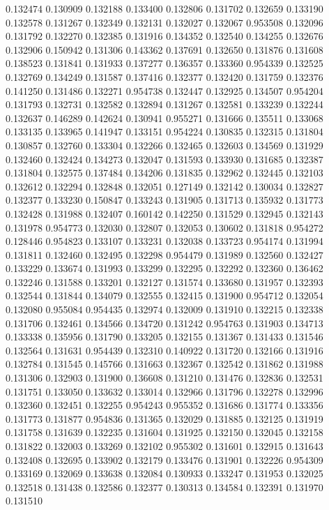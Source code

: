 0.132474
0.130909
0.132188
0.133400
0.132806
0.131702
0.132659
0.133190
0.132578
0.131267
0.132349
0.132131
0.132027
0.132067
0.953508
0.132096
0.131792
0.132270
0.132385
0.131916
0.134352
0.132540
0.134255
0.132676
0.132906
0.150942
0.131306
0.143362
0.137691
0.132650
0.131876
0.131608
0.138523
0.131841
0.131933
0.137277
0.136357
0.133360
0.954339
0.132525
0.132769
0.134249
0.131587
0.137416
0.132377
0.132420
0.131759
0.132376
0.141250
0.131486
0.132271
0.954738
0.132447
0.132925
0.134507
0.954204
0.131793
0.132731
0.132582
0.132894
0.131267
0.132581
0.133239
0.132244
0.132637
0.146289
0.142624
0.130941
0.955271
0.131666
0.135511
0.133068
0.133135
0.133965
0.141947
0.133151
0.954224
0.130835
0.132315
0.131804
0.130857
0.132760
0.133304
0.132266
0.132465
0.132603
0.134569
0.131929
0.132460
0.132424
0.134273
0.132047
0.131593
0.133930
0.131685
0.132387
0.131804
0.132575
0.137484
0.134206
0.131835
0.132962
0.132445
0.132103
0.132612
0.132294
0.132848
0.132051
0.127149
0.132142
0.130034
0.132827
0.132377
0.133230
0.150847
0.133243
0.131905
0.131713
0.135932
0.131773
0.132428
0.131988
0.132407
0.160142
0.142250
0.131529
0.132945
0.132143
0.131978
0.954773
0.132030
0.132807
0.132053
0.130602
0.131818
0.954272
0.128446
0.954823
0.133107
0.133231
0.132038
0.133723
0.954174
0.131994
0.131811
0.132460
0.132495
0.132298
0.954479
0.131989
0.132560
0.132427
0.133229
0.133674
0.131993
0.133299
0.132295
0.132292
0.132360
0.136462
0.132246
0.131588
0.133201
0.132127
0.131574
0.133680
0.131957
0.132393
0.132544
0.131844
0.134079
0.132555
0.132415
0.131900
0.954712
0.132054
0.132080
0.955084
0.954435
0.132974
0.132009
0.131910
0.132215
0.132338
0.131706
0.132461
0.134566
0.134720
0.131242
0.954763
0.131903
0.134713
0.133338
0.135956
0.131790
0.133205
0.132155
0.131367
0.131433
0.131546
0.132564
0.131631
0.954439
0.132310
0.140922
0.131720
0.132166
0.131916
0.132784
0.131545
0.145766
0.131663
0.132367
0.132542
0.131862
0.131988
0.131306
0.132903
0.131900
0.136608
0.131210
0.131476
0.132836
0.132531
0.131751
0.133050
0.133632
0.133014
0.132966
0.131796
0.132278
0.132996
0.132360
0.132451
0.132255
0.954243
0.955352
0.131686
0.131774
0.133356
0.131773
0.131877
0.954836
0.131365
0.132029
0.131885
0.132125
0.131919
0.131758
0.131639
0.132235
0.131604
0.131925
0.132150
0.132045
0.132158
0.131822
0.132003
0.133269
0.132102
0.955302
0.131601
0.132915
0.131643
0.132408
0.132695
0.133902
0.132179
0.133476
0.131901
0.132226
0.954309
0.133169
0.132069
0.133638
0.132084
0.130933
0.133247
0.131953
0.132025
0.132518
0.131438
0.132586
0.132377
0.130313
0.134584
0.132391
0.131970
0.131510
